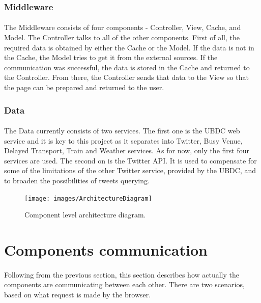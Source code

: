 \documentclass{l4proj}
\begin{document}
\subsubsection{Middleware}
\paragraph{}
The Middleware consists of four components - Controller, View, Cache, and Model. The Controller talks to all of the other components. First of all, the required data is obtained by either the Cache or the Model. If the data is not in the Cache, the Model tries to get it from the external sources. If the communication was successful, the data is stored in the Cache and returned to the Controller. From there, the Controller sends that data to the View so that the page can be prepared and returned to the user. 

\subsubsection{Data}
\paragraph{}
The Data currently consists of two services. The first one is the UBDC web service and it is key to this project as it separates into Twitter, Busy Venue, Delayed Transport, Train and Weather services. As for now, only the first four services are used. The second on is the Twitter API. It is used to compensate for some of the limitations of the other Twitter service, provided by the UBDC, and to broaden the possibilities of tweets querying.        
  

\begin{figure}[H]
	\centering
	\texttt{[image: images/ArchitectureDiagram]}
	\caption{Component level architecture diagram.}
	\label{componentDiagram}
\end{figure}


\clearpage
\section{Components communication}
\paragraph{}
Following from the previous section, this section describes how actually the components are communicating between each other. There are two scenarios, based on what request is made by the browser. 
\end{document}
